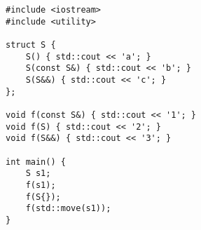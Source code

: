 \begin{lstlisting}[title=\href{https://godbolt.org/z/jaYTYP}{\texttt{godbolt.org/z/jaYTYP}}]
#include <iostream>
#include <utility>

struct S {
    S() { std::cout << 'a'; }
    S(const S&) { std::cout << 'b'; }
    S(S&&) { std::cout << 'c'; }
};

void f(const S&) { std::cout << '1'; }
void f(S) { std::cout << '2'; }
void f(S&&) { std::cout << '3'; }

int main() {
    S s1;
    f(s1);
    f(S{});
    f(std::move(s1));
}
\end{lstlisting}
